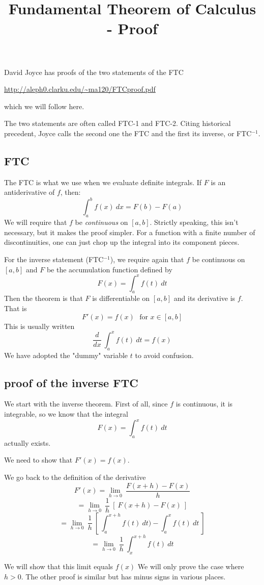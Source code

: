 \documentclass[11pt, oneside]{article}   	%
\title{Fundamental Theorem of Calculus - Proof}
\date{}							%
\begin{document}
\maketitle
\Large
David Joyce has proofs of the two statements of the FTC

\url{http://aleph0.clarku.edu/~ma120/FTCproof.pdf}

which we will follow here.

The two statements are often called FTC-1 and FTC-2.  Citing historical precedent, Joyce calls the second one the FTC and the first its inverse, or FTC$^{-1}$.
\subsection*{FTC}
The FTC is what we use when we evaluate definite integrals.  If $F$ is an antiderivative of $f$, then:
\[ \int_a^b f(x) \ dx = F(b) - F(a) \]
We will require that $f$ be \emph{continuous} on $[a,b]$.  Strictly speaking, this isn't necessary, but it makes the proof simpler.  For a function with a finite number of discontinuities, one can just chop up the integral into its component pieces.

For the inverse statement (FTC$^{-1}$), we require again that $f$ be continuous on $[a,b]$ and $F$ be the accumulation function defined by
\[ F(x) = \int_a^x f(t) \ dt \]
Then the theorem is that $F$ is differentiable on $[a,b]$ and its derivative is $f$.  That is
\[ F'(x) = f(x) \ \ \ \text{for } x \in [a,b] \]
This is usually written
\[ \frac{d}{dx} \ \int_a^x f(t) \ dt = f(x) \]
We have adopted the "dummy" variable $t$ to avoid confusion.
\subsection*{proof of the inverse FTC}
We start with the inverse theorem.  First of all, since $f$ is continuous, it is integrable, so we know that the integral
\[ F(x) = \int_a^x f(t) \ dt \]
actually exists.

We need to show that $F'(x) = f(x)$.  

We go back to the definition of the derivative
\[ F'(x) = \lim_{h \rightarrow 0} \ \frac{F(x+h) - F(x)}{h} \]
\[ = \lim_{h \rightarrow 0} \ \frac{1}{h} \ [ \ F(x+h) - F(x) \ ] \]
\[ = \lim_{h \rightarrow 0} \ \frac{1}{h} \ [ \ \int_a^{x+h} f(t) \ dt) - \int_a^x f(t) \ dt \ ] \]
\[ = \lim_{h \rightarrow 0} \ \frac{1}{h} \ \int_x^{x+h} f(t) \ dt \]

We will show that this limit equals $f(x)$  We will only prove the case where $h > 0$.  The other proof is similar but has minus signs in various places.
\end{document}

